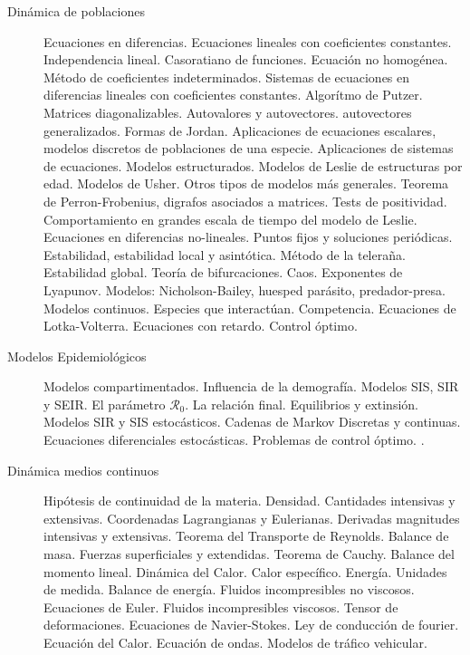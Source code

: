 \documentclass[a4paper,10pt,BCOR10mm,oneside,headsepline]{scrbook}
\begin{document}
\begin{enumerate}
\begin{description}
\item[Dinámica de poblaciones] Ecuaciones en diferencias. Ecuaciones lineales con coeficientes constantes. Independencia lineal. Casoratiano de funciones. Ecuación no homogénea. Método de coeficientes indeterminados. Sistemas de ecuaciones en diferencias lineales con coeficientes constantes. Algorítmo de Putzer. Matrices diagonalizables. Autovalores y autovectores. autovectores generalizados. Formas de Jordan.  Aplicaciones de ecuaciones escalares, modelos discretos de poblaciones de una
especie. Aplicaciones de sistemas de ecuaciones. Modelos estructurados. Modelos de
Leslie de estructuras por edad. Modelos de Usher. Otros tipos de modelos más generales. Teorema de Perron-Frobenius, digrafos asociados a matrices. Tests de positividad. Comportamiento en grandes escala de tiempo del modelo de Leslie. 
 Ecuaciones en diferencias no-lineales. Puntos fijos y soluciones periódicas. Estabilidad, estabilidad local y asintótica. Método de la teleraña. Estabilidad global. Teoría de bifurcaciones. Caos. Exponentes de Lyapunov. Modelos: Nicholson-Bailey, huesped parásito, predador-presa. Modelos continuos. Especies que interactúan. Competencia. Ecuaciones de Lotka-Volterra. Ecuaciones con retardo. Control óptimo. \cite{LindaJ.S.Allen747,SaberN.Elaydi423,RichardHaberman712,ElizabethS.Allman375, MartinBraun727,RichardHaberman712,YangKuang742,JamesD.Murray744,anita2011introduction}

\item[Modelos Epidemiológicos]  Modelos compartimentados. Influencia de la demografía. Modelos SIS, SIR y SEIR. El parámetro $\mathscr{R}_0$. La relación final. Equilibrios y extinsión. Modelos SIR y SIS estocásticos. Cadenas de Markov Discretas y continuas. Ecuaciones diferenciales estocásticas. Problemas de control óptimo. \cite{FredBrauer479,MaiaMartcheva480,FredBrauer,AllenSto,BerndBlasius746,OdoDiekmann614,JamesD.Murray745,JamesD.Murray744,anita2011introduction}.


\item[Dinámica medios continuos] Hipótesis de continuidad de la materia. Densidad. Cantidades intensivas y extensivas. Coordenadas Lagrangianas y Eulerianas. Derivadas magnitudes intensivas y extensivas. Teorema del Transporte de Reynolds.  Balance  de  masa. Fuerzas superficiales y extendidas. Teorema de Cauchy. Balance del momento lineal. Dinámica del Calor.  Calor específico. Energía. Unidades de medida.    Balance de energía. Fluidos incompresibles no viscosos.  Ecuaciones de Euler.  Fluidos incompresibles  viscosos. Tensor de deformaciones. Ecuaciones de Navier-Stokes. Ley de conducción de fourier. Ecuación del Calor. Ecuación de ondas. Modelos de tráfico vehicular.\cite{MarkH.Holmes706,JacekBanasiak709, MartinBraun727,bellomo1994modelling,AlexandreJ.Chorin749,FridtjovIrgens750,MichaelGriebel751,GiovanniP.Galdi752,PieterWesseling754,RichardHaberman712,C.C.Lin720}



\end{description}
\end{enumerate}
\end{document}
